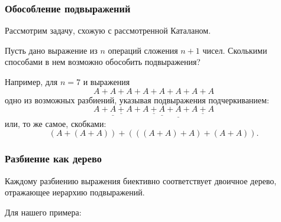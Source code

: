 \documentclass[mathserif]{beamer}
\begin{document}
\begin{frame}[fragile]%
\frametitle{Обособление подвыражений}

Рассмотрим задачу, схожую с рассмотренной Каталаном.

\medskip

Пусть дано выражение из $n$ операций сложения $n+1$ чисел.
Сколькими способами в нем возможно обособить подвыражения?

\medskip

Например, для $n=7$ и выражения
\[A + A + A + A + A + A + A + A\]
одно из возможных разбиений, указывая подвыражения подчеркиванием:
\[\underline{A + \underline{A + A}} + \underline{\underline{\underline{A + A} + A} + \underline{A + A}}\]
или, то же самое, скобками:
\[(A + (A + A)) + (((A + A) + A) + (A + A)).\]
\end{frame}

\begin{frame}[fragile]%
\frametitle{Разбиение как дерево}
Каждому разбиению выражения биективно соответствует двоичное дерево, отражающее иерархию подвыражений.

Для нашего примера:

\begin{center}
\end{center}
\end{frame}
\end{document}
